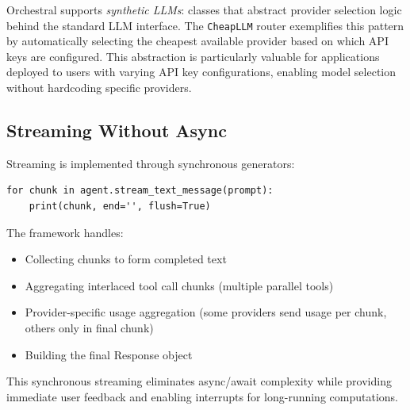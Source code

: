 \documentclass{article}
\begin{document}

Orchestral supports \textit{synthetic LLMs}: classes that abstract provider selection logic behind the standard LLM interface. The \texttt{CheapLLM} router exemplifies this pattern by automatically selecting the cheapest available provider based on which API keys are configured. This abstraction is particularly valuable for applications deployed to users with varying API key configurations, enabling model selection without hardcoding specific providers.

\subsection{Streaming Without Async}

Streaming is implemented through synchronous generators:

\begin{verbatim}
for chunk in agent.stream_text_message(prompt):
    print(chunk, end='', flush=True)
\end{verbatim}

The framework handles:
\begin{itemize}
    \item Collecting chunks to form completed text
    \item Aggregating interlaced tool call chunks (multiple parallel tools)
    \item Provider-specific usage aggregation (some providers send usage per chunk, others only in final chunk)
    \item Building the final Response object
\end{itemize}

This synchronous streaming eliminates async/await complexity while providing immediate user feedback and enabling interrupts for long-running computations.
\end{document}
